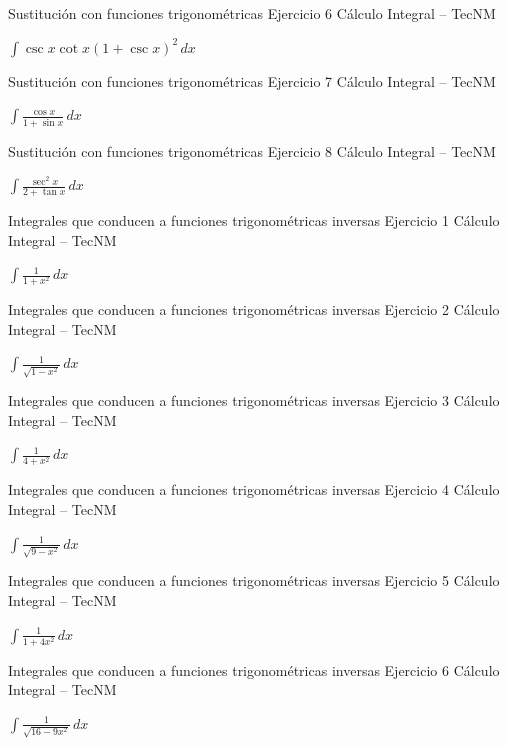 \documentclass[aspectratio=169,12pt]{beamer}
\newcommand{\ejercicio}[1]{%
  \begin{center}
  \vfill
  {\fontsize{24}{30}\selectfont #1}
  \vfill
  \end{center}
}
\begin{document}
\begin{frame}{Sustitución con funciones trigonométricas}
\small Ejercicio 6 \hfill Cálculo Integral -- TecNM
\ejercicio{$\displaystyle \int\csc x\cot x(1+\csc x)^2\,dx$}
\end{frame}

\begin{frame}{Sustitución con funciones trigonométricas}
\small Ejercicio 7 \hfill Cálculo Integral -- TecNM
\ejercicio{$\displaystyle \int\frac{\cos x}{1+\sin x}\,dx$}
\end{frame}

\begin{frame}{Sustitución con funciones trigonométricas}
\small Ejercicio 8 \hfill Cálculo Integral -- TecNM
\ejercicio{$\displaystyle \int\frac{\sec^2x}{2+\tan x}\,dx$}
\end{frame}

\begin{frame}{Integrales que conducen a funciones trigonométricas inversas}
\small Ejercicio 1 \hfill Cálculo Integral -- TecNM
\ejercicio{$\displaystyle \int\frac{1}{1+x^2}\,dx$}
\end{frame}

\begin{frame}{Integrales que conducen a funciones trigonométricas inversas}
\small Ejercicio 2 \hfill Cálculo Integral -- TecNM
\ejercicio{$\displaystyle \int\frac{1}{\sqrt{1-x^2}}\,dx$}
\end{frame}

\begin{frame}{Integrales que conducen a funciones trigonométricas inversas}
\small Ejercicio 3 \hfill Cálculo Integral -- TecNM
\ejercicio{$\displaystyle \int\frac{1}{4+x^2}\,dx$}
\end{frame}

\begin{frame}{Integrales que conducen a funciones trigonométricas inversas}
\small Ejercicio 4 \hfill Cálculo Integral -- TecNM
\ejercicio{$\displaystyle \int\frac{1}{\sqrt{9-x^2}}\,dx$}
\end{frame}

\begin{frame}{Integrales que conducen a funciones trigonométricas inversas}
\small Ejercicio 5 \hfill Cálculo Integral -- TecNM
\ejercicio{$\displaystyle \int\frac{1}{1+4x^2}\,dx$}
\end{frame}

\begin{frame}{Integrales que conducen a funciones trigonométricas inversas}
\small Ejercicio 6 \hfill Cálculo Integral -- TecNM
\ejercicio{$\displaystyle \int\frac{1}{\sqrt{16-9x^2}}\,dx$}
\end{frame}
\end{document}
